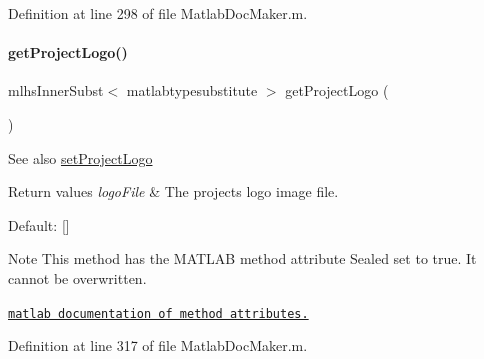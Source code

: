 Definition at line 298 of file Matlab\+Doc\+Maker.\+m.

\mbox{\label{class_matlab_doc_maker_a80cf6644c2827176070ac768e1c07538}} 
\paragraph{\texorpdfstring{get\+Project\+Logo()}{getProjectLogo()}}
{\footnotesize\ttfamily mlhs\+Inner\+Subst$<$ matlabtypesubstitute $>$ get\+Project\+Logo (\begin{DoxyParamCaption}{ }\end{DoxyParamCaption})\hspace{0.3cm}{\ttfamily [static]}}

\begin{DoxySeeAlso}{See also}
\hyperlink{class_matlab_doc_maker_a01cb613496ec3db0c68249d8af346ac4}{set\+Project\+Logo}
\end{DoxySeeAlso}

\begin{DoxyRetVals}{Return values}
{\em logo\+File} & The projects logo image file. \\
\hline
\end{DoxyRetVals}
\begin{DoxyParagraph}{Default\+:}
\mbox{[}\mbox{]}
\end{DoxyParagraph}
\begin{DoxyNote}{Note}
This method has the M\+A\+T\+L\+AB method attribute {\ttfamily Sealed} set to true. It cannot be overwritten. 

\href{http://www.mathworks.com/help/matlab/matlab_oop/method-attributes.html}{\tt matlab documentation of method attributes.} 
\end{DoxyNote}


Definition at line 317 of file Matlab\+Doc\+Maker.\+m.

